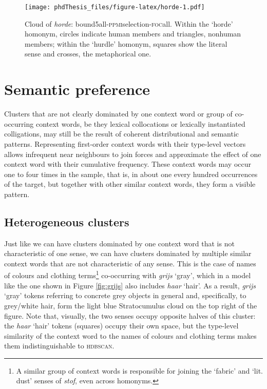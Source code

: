 \documentclass[
]{book}
\begin{document}
\begin{figure}
\centering
\texttt{[image: phdThesis\_files/figure-latex/horde-1.pdf]}
\caption{\label{fig:horde}Cloud of \emph{horde}: bound5all-\textsc{ppmi}selection-\textsc{foc}all. Within the `horde' homonym, circles indicate human members and triangles, nonhuman members; within the `hurdle' homonym, squares show the literal sense and crosses, the metaphorical one.}
\end{figure}

\hypertarget{semantic-preference}{%
\section{Semantic preference}\label{semantic-preference}}

Clusters that are not clearly dominated by one context word or group of co-occurring context words, be they lexical collocations or lexically instantiated colligations, may still be the result of coherent distributional and semantic patterns. Representing first-order context words with their type-level vectors allows infrequent near neighbours to join forces and approximate the effect of one context word with their cumulative frequency. These context words may occur one to four times in the sample, that is, in about one every hundred occurrences of the target, but together with other similar context words, they form a visible pattern.

\hypertarget{uitspraak}{%
\subsection{Heterogeneous clusters}\label{uitspraak}}

Just like we can have clusters dominated by one context word that is not characteristic of one sense, we can have clusters dominated by multiple similar context words that are not characteristic of any sense. This is the case of names of colours and clothing terms\footnote{A similar group of context words is responsible for joining the `fabric' and `lit. dust' senses of \emph{stof}, even across homonyms.} co-occurring with \emph{grijs} `gray', which in a model like the one shown in Figure \ref{fig:grijs} also includes \emph{haar} `hair'.
As a result, \emph{grijs} `gray' tokens referring to concrete grey objects in general and, specifically, to grey/white hair, form the light blue Stratocumulus cloud on the top right of the figure. Note that, visually, the two senses occupy opposite halves of this cluster: the \emph{haar} `hair' tokens (squares) occupy their own space, but the type-level similarity of the context word to the names of colours and clothing terms makes them indistinguishable to \textsc{hdbscan}.
\end{document}

